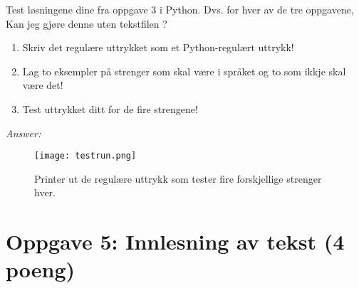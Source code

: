 \documentclass[a4paper, 12pt,]{article}             %
\begin{document}
Test løsningene dine fra oppgave 3 i Python. Dvs. for hver av de tre oppgavene, Kan jeg gjøre denne uten tekstfilen ?

\begin{enumerate}
\item Skriv det regulære uttrykket som et Python-regulært uttrykk! 
\item Lag to eksempler på strenger som skal være i språket og to som ikkje skal være det! 
\item Test uttrykket ditt for de fire strengene! 
\end{enumerate}


\textit{Answer:}

\begin{figure}[h!]
    \centering
    \texttt{[image: testrun.png]}
    \caption{Printer ut de regulære uttrykk som tester fire forskjellige strenger hver.}
    \label{fig:awesome_image}
  \end{figure}

\section*{Oppgave 5: Innlesning av tekst (4 poeng)}
\end{document}
